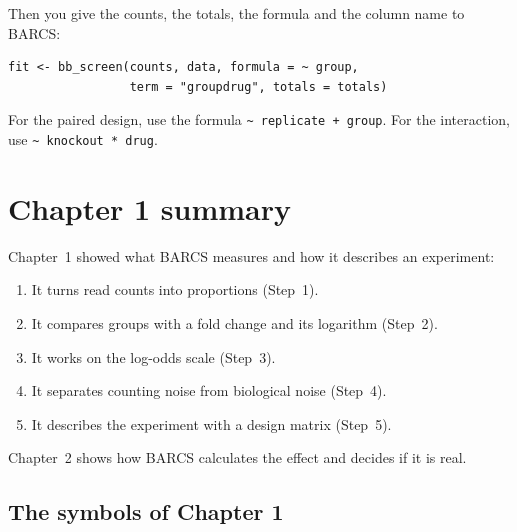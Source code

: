 Then you give the counts, the totals, the formula and the column name to
BARCS:

\begin{center}
\begin{minipage}{0.86\textwidth}
\small
\begin{verbatim}
fit <- bb_screen(counts, data, formula = ~ group,
                 term = "groupdrug", totals = totals)
\end{verbatim}
\end{minipage}
\end{center}

For the paired design, use the formula \texttt{\textasciitilde\ replicate +
group}. For the interaction, use \texttt{\textasciitilde\ knockout * drug}.

\section{Chapter 1 summary}

Chapter~1 showed what BARCS measures and how it describes an experiment:
\begin{enumerate}
\item It turns read counts into proportions (Step~1).
\item It compares groups with a fold change and its logarithm (Step~2).
\item It works on the log-odds scale (Step~3).
\item It separates counting noise from biological noise (Step~4).
\item It describes the experiment with a design matrix (Step~5).
\end{enumerate}
Chapter~2 shows how BARCS calculates the effect and decides if it is real.

\subsection*{The symbols of Chapter 1}

